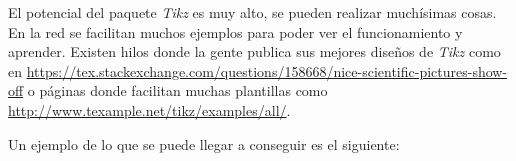 El potencial del paquete \textit{Tikz} es muy alto, se pueden realizar muchísimas cosas. En la red se facilitan muchos ejemplos para poder ver el funcionamiento y aprender. Existen hilos donde la gente publica sus mejores diseños de \textit{Tikz} como en \url{https://tex.stackexchange.com/questions/158668/nice-scientific-pictures-show-off} o páginas donde facilitan muchas plantillas como \url{http://www.texample.net/tikz/examples/all/}.
\par Un ejemplo de lo que se puede llegar a conseguir es el siguiente:

